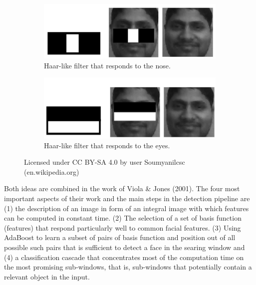 \documentclass[11pt,a4paper]{article}
\begin{document}
\begin{figure}[t!]
    \centering
    \begin{subfigure}[b]{.49\linewidth}
        \includegraphics[width=\linewidth]{figures/Haar_Feature_that_looks_similar_to_the_bridge_of_the_nose_is_applied_onto_the_face.jpg}
        \caption{Haar-like filter that responds to the nose.}
        \label{fig:<+label+>}
    \end{subfigure}
    \begin{subfigure}[b]{.49\linewidth}
        \includegraphics[width=\linewidth]{figures/Haar_Feature_that_looks_similar_to_the_eye_region_which_is_darker_than_the_upper_cheeks_is_applied_onto_a_face.jpg}
        \caption{Haar-like filter that responds to the eyes.}
        \label{fig:<+label+>}
    \end{subfigure}
    \caption{Licensed under CC BY-SA 4.0 by user Soumyanilcsc (en.wikipedia.org)}
    \label{fig:haar-filter}
\end{figure}

Both ideas are combined in the work of Viola \& Jones (2001)\cite{ViolaJones2001}. The four most important aspects of their work and the main steps in the detection pipeline are (1) the description of an image in form of an integral image with which features can be computed in constant time. (2) The selection of a set of basis function (features) that respond particularly well to common facial features. (3) Using AdaBoost to learn a subset of pairs of basis function and position out of all possible such pairs that is sufficient to detect a face in the searing window and (4) a classification cascade that concentrates most of the computation time on the most promising sub-windows, that is, sub-windows that potentially contain a relevant object in the input.
\end{document}
